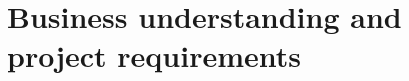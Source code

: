 
\setcounter{chapter}{1}
\chapter{Business understanding and project requirements}
\label{ch:business_understanding}
\minitoc %
\graphicspath{{Chapitre2/figures/}}


\pagestyle{fancy}
\fancyhf{}
\fancyhead[R]{\bfseries\rightmark}
\fancyfoot[R]{\thepage}
\renewcommand{\headrulewidth}{0.5pt}
\renewcommand{\footrulewidth}{0pt}
\renewcommand{\chaptermark}[1]{\markboth{\MakeUppercase{\chaptername~\thechapter. #1 }}{}}
\renewcommand{\sectionmark}[1]{\markright{\thechapter.\thesection~ #1}}

